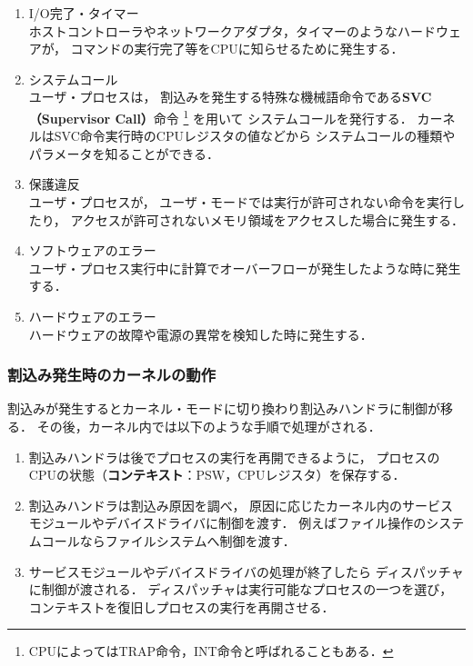 \begin{enumerate}
\item I/O完了・タイマー \\
ホストコントローラやネットワークアダプタ，タイマーのようなハードウェアが，
コマンドの実行完了等をCPUに知らせるために発生する．

\item システムコール \\
ユーザ・プロセスは，
割込みを発生する特殊な機械語命令である{\bf SVC（Supervisor Call）}命令
\footnote{
CPUによってはTRAP命令，INT命令と呼ばれることもある．
}
を用いて
システムコールを発行する．
カーネルはSVC命令実行時のCPUレジスタの値などから
システムコールの種類やパラメータを知ることができる．

\item 保護違反 \\
ユーザ・プロセスが，
ユーザ・モードでは実行が許可されない命令を実行したり，
アクセスが許可されないメモリ領域をアクセスした場合に発生する．

\item ソフトウェアのエラー \\
ユーザ・プロセス実行中に計算でオーバーフローが発生したような時に発生する．

\item ハードウェアのエラー \\
ハードウェアの故障や電源の異常を検知した時に発生する．

\end{enumerate}

\subsubsection{割込み発生時のカーネルの動作}
割込みが発生するとカーネル・モードに切り換わり割込みハンドラに制御が移る．
その後，カーネル内では以下のような手順で処理がされる．

\begin{enumerate}
\item 割込みハンドラは後でプロセスの実行を再開できるように，
プロセスのCPUの状態（{\bf コンテキスト}：PSW，CPUレジスタ）を保存する．

\item 割込みハンドラは割込み原因を調べ，
原因に応じたカーネル内のサービスモジュールやデバイスドライバに制御を渡す．
例えばファイル操作のシステムコールならファイルシステムへ制御を渡す．

\item サービスモジュールやデバイスドライバの処理が終了したら
ディスパッチャに制御が渡される．
ディスパッチャは実行可能なプロセスの一つを選び，
コンテキストを復旧しプロセスの実行を再開させる．
\end{enumerate}

